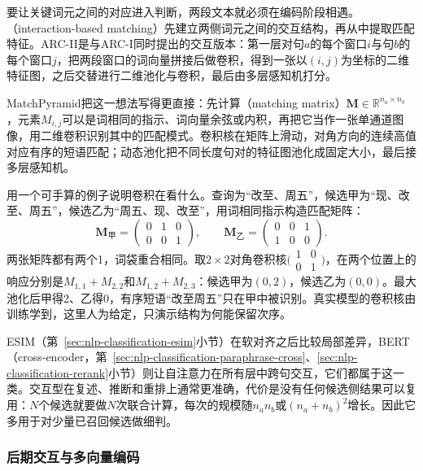 要让关键词元之间的对应进入判断，两段文本就必须在编码阶段相遇。（interaction-based matching）先建立两侧词元之间的交互结构，再从中提取匹配特征。ARC-II是与ARC-I同时提出的交互版本：第一层对句$a$的每个窗口$i$与句$b$的每个窗口$j$，把两段窗口的词向量拼接后做卷积，得到一张以$(i,j)$为坐标的二维特征图，之后交替进行二维池化与卷积，最后由多层感知机打分。

MatchPyramid把这一想法写得更直接：先计算（matching matrix）$\bm M\in\mathbb R^{n_a\times n_b}$，元素$M_{i,j}$可以是词相同的指示、词向量余弦或内积，再把它当作一张单通道图像，用二维卷积识别其中的匹配模式。卷积核在矩阵上滑动，对角方向的连续高值对应有序的短语匹配；动态池化把不同长度句对的特征图池化成固定大小，最后接多层感知机。

用一个可手算的例子说明卷积在看什么。查询为“改至、周五”，候选甲为“现、改至、周五”，候选乙为“周五、现、改至”，用词相同指示构造匹配矩阵：
\[
  \bm M_{\text{甲}}=\begin{pmatrix}0&1&0\\0&0&1\end{pmatrix},\qquad
  \bm M_{\text{乙}}=\begin{pmatrix}0&0&1\\1&0&0\end{pmatrix}.
\]
两张矩阵都有两个1，词袋重合相同。取$2\times2$对角卷积核$\bigl(\begin{smallmatrix}1&0\\0&1\end{smallmatrix}\bigr)$，在两个位置上的响应分别是$M_{1,1}+M_{2,2}$和$M_{1,2}+M_{2,3}$：候选甲为$(0,2)$，候选乙为$(0,0)$。最大池化后甲得2、乙得0，有序短语“改至周五”只在甲中被识别。真实模型的卷积核由训练学到，这里人为给定，只演示结构为何能保留次序。

ESIM（第~\ref{sec:nlp-classification-esim}小节）在软对齐之后比较局部差异，BERT（cross-encoder，第~\ref{sec:nlp-classification-paraphrase-cross}、\ref{sec:nlp-classification-rerank}小节）则让自注意力在所有层中跨句交互，它们都属于这一类。交互型在复述、推断和重排上通常更准确，代价是没有任何候选侧结果可以复用：$N$个候选就要做$N$次联合计算，每次的规模随$n_an_b$或$(n_a+n_b)^2$增长。因此它多用于对少量已召回候选做细判。

\subsubsection{后期交互与多向量编码}
\label{sec:nlp-classification-late-interaction}

